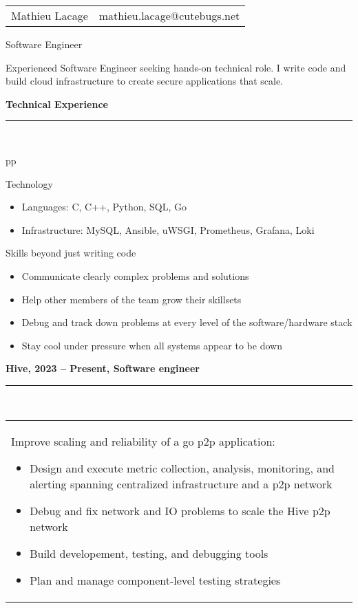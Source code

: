 \documentclass[a4paper,12pt]{article}
\newcommand{\ligne}[1]{\rule[0.5ex]{\textwidth}{#1}\\}
\newcommand{\styleRub}[1]{\textbf{\large #1}\par}
\newcommand{\indentStd}{\noindent\hspace*{10pt}}
\newenvironment{rubrique}[2][\linewidth]%
{\styleRub{#2}%
\ligne{0.5mm}
\setlength{\lenB}{#1}%
\setlength{\lenC}{\linewidth}%
\addtolength{\lenC}{-\lenA}%
\addtolength{\lenC}{-\lenB}%
\addtolength{\lenC}{-19pt}
\indentStd\begin{tabular}[t]{p{\lenB}p{\lenC}}}
{\end{tabular}}
\newlength{\lenA} %
\newlength{\lenB} %
\newlength{\lenC} %
\begin{document}
\begin{tabular*}{1\textwidth}{@{\extracolsep{\fill}}lr}
Mathieu Lacage & mathieu.lacage@cutebugs.net\\
\end{tabular*}

\vspace{1cm}
\begin{center}{\huge Software Engineer}\end{center}

\begin{center}
Experienced Software Engineer seeking hands-on technical role.\newline
        I write code and build cloud infrastructure to create
secure applications that scale.
\end{center}

\vspace{1cm}
\begin{rubrique}{Technical Experience}

Technology
\begin{itemize}
\item Languages: C, C++, Python, SQL, Go
\item Infrastructure: MySQL, Ansible, uWSGI, Prometheus, Grafana, Loki
\end{itemize}

Skills beyond just writing code
\begin{itemize}
\item Communicate clearly complex problems and solutions
\item Help other members of the team grow their skillsets
\item Debug and track down problems at every level of the software/hardware stack
\item Stay cool under pressure when all systems appear to be down
\end{itemize}

\end{rubrique}

\vspace{0.5cm}
\begin{rubrique}{Hive, 2023 -- Present, Software engineer}

Improve scaling and reliability of a go p2p application:
\begin{itemize}
\item Design and execute metric collection, analysis, monitoring, and alerting
        spanning centralized infrastructure and a p2p network
\item Debug and fix network and IO problems to scale the Hive p2p network
\item Build developement, testing, and debugging tools
\item Plan and manage component-level testing strategies
\end{itemize}

\end{rubrique}
\pagebreak
\end{document}

